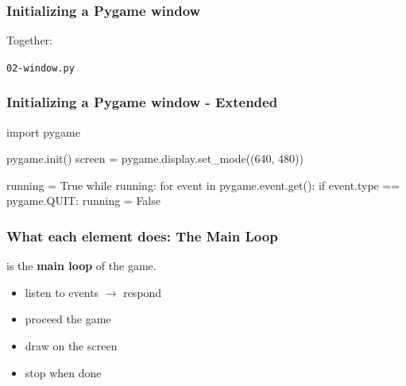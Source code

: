 \documentclass[]{beamer}   %
\begin{document}


\begin{frame}
\frametitle{Initializing a Pygame window}
Together:
\medskip
\initWindow
\pause
\bigskip

\textcolor{tg}{\texttt{02-window.py}}

\end{frame}




\begin{frame}[fragile]
\frametitle{Initializing a Pygame window - Extended}
\begin{pythoncode}
               	
    import pygame

    pygame.init()
    screen = pygame.display.set_mode((640, 480))

    running = True
    while running:
        for event in pygame.event.get():
            if event.type == pygame.QUIT:
                running = False
        
\end{pythoncode}        
\end{frame}

\begin{frame}
\frametitle{What each element does: The Main Loop}

\mainLoop
  
\medskip

is the \textbf{main loop} of the game.
\pause
\begin{itemize}
\item listen to events $\rightarrow$ respond
\pause
\item proceed the game
\pause
\item draw on the screen
\pause
\item stop when done
\end{itemize}
\end{frame}
\end{document}
